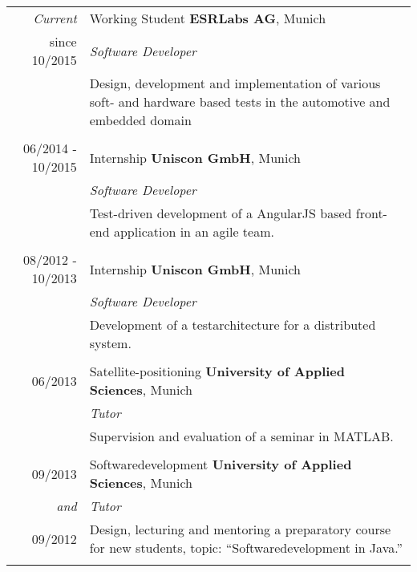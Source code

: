 \documentclass[a4paper,10pt]{article} %
\begin{document}
\begin{tabular}{r|p{11cm}}
        \textit{Current}        & Working Student \textbf{ESRLabs AG}, Munich\\
since \textsc{10/2015}          & \emph{Software Developer} \\
                                & \small{Design, development and implementation of various soft- and hardware based tests in the automotive and embedded domain} \\
\multicolumn{2}{c}{} \\
 
\textsc{06/2014 - 10/2015}      & Internship \textbf{Uniscon GmbH}, Munich\\
                                & \emph{Software Developer} \\
                                & \small{Test-driven development of a AngularJS based front-end application in an agile team.} \\
\multicolumn{2}{c}{} \\

 \textsc{08/2012 - 10/2013}     & Internship \textbf{Uniscon GmbH}, Munich\\
           		        & \emph{Software Developer}\\
                                & \small{Development of a testarchitecture for a distributed system.} \\
\multicolumn{2}{c}{} \\
 
 
\textsc{06/2013}           & Satellite-positioning \textbf{University of Applied Sciences}, Munich \\
                           & \emph{Tutor}\\
                           & \small{Supervision and evaluation of a seminar in MATLAB.}\\
\multicolumn{2}{c}{} \\
 
\textsc{09/2013}           & Softwaredevelopment \textbf{University of Applied Sciences}, Munich \\
\emph{and}                 & \emph{Tutor}\\
\textsc{09/2012}           & \small{Design, lecturing and mentoring a preparatory course for new students, topic: ``Softwaredevelopment in Java.''}\\
\multicolumn{2}{c}{} \\
 

\end{tabular}
\end{document}
